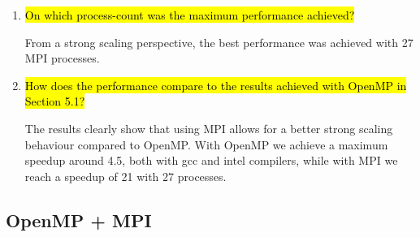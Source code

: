 \documentclass{article}
\begin{document}
\begin{enumerate}
	\item \hl{On which process-count was the maximum performance achieved?}

	From a strong scaling perspective, the best performance was achieved with 27 MPI processes.

	\item \hl{How does the performance compare to the results achieved with OpenMP in Section 5.1?}

	The results clearly show that using MPI allows for a better strong scaling behaviour compared to OpenMP. With OpenMP we achieve a maximum speedup around 4.5, both with gcc and intel compilers, while with MPI we reach a speedup of 21 with 27 processes.
\end{enumerate}

\subsection{OpenMP + MPI}
\end{document}
